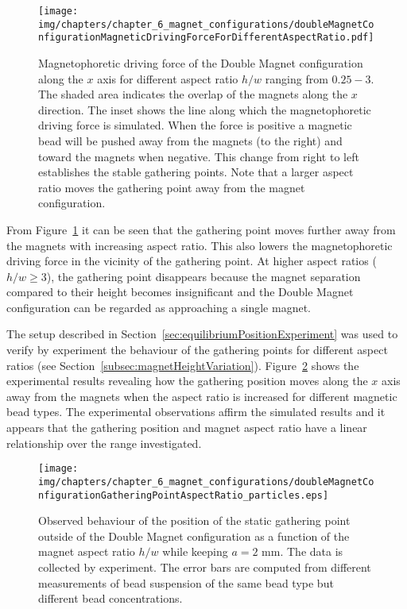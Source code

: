 \begin{figure}[htb]
	\centering
	\texttt{[image: img/chapters/chapter\_6\_magnet\_configurations/doubleMagnetConfigurationMagneticDrivingForceForDifferentAspectRatio.pdf]}
\caption[Magnetophoretic driving force of the Double Magnet configuration for different magnet aspect ratio]{Magnetophoretic driving force of the Double Magnet configuration along the $x$ axis for different aspect ratio $h/w$ ranging from $0.25-3$. The shaded area indicates the overlap of the magnets along the $x$ direction. The inset shows the line along which the magnetophoretic driving force is simulated. When the force is positive a magnetic bead will be pushed away from the magnets (to the right) and toward the magnets when negative. This change from right to left establishes the stable gathering points. Note that a larger aspect ratio moves the gathering point away from the magnet configuration.}
\label{fig:doubleMagnetConfigurationMagneticDrivingForceAndFluxDensityForDifferentAspectRatio}
\end{figure}

From Figure~\ref{fig:doubleMagnetConfigurationMagneticDrivingForceAndFluxDensityForDifferentAspectRatio} it can be seen that the gathering point  moves further away from the magnets with increasing aspect ratio. This also lowers the magnetophoretic driving force in the vicinity of the gathering point. At higher aspect ratios ($h/w \geq 3$), the gathering point disappears because the magnet separation compared to their height becomes insignificant and the Double Magnet configuration can be regarded as approaching a single magnet.  

The setup described in Section~\ref{sec:equilibriumPositionExperiment} was used to verify by experiment the behaviour of the gathering points for different aspect ratios (see Section~\ref{subsec:magnetHeightVariation}). Figure~\ref{fig:stableGatheringPointAspectRatio} shows the experimental results revealing how the gathering position moves along the $x$ axis away from the magnets when the aspect ratio is increased for different magnetic bead types. The experimental observations affirm the simulated results and it appears that the gathering position and magnet aspect ratio have a linear relationship over the range investigated.

\begin{figure}[htb]
\centering
	\texttt{[image: img/chapters/chapter\_6\_magnet\_configurations/doubleMagnetConfigurationGatheringPointAspectRatio\_particles.eps]}
\caption[Observed behaviour of position of the static gathering point as a function of the magnet aspect ratio]{Observed behaviour of the position of the static gathering point outside of the Double Magnet configuration as a function of the magnet aspect ratio $h/w$ while keeping $a=2$ mm. The data is collected by experiment. The error bars are computed from different measurements of bead suspension of the same bead type but different bead concentrations.}
\label{fig:stableGatheringPointAspectRatio}
\end{figure}

